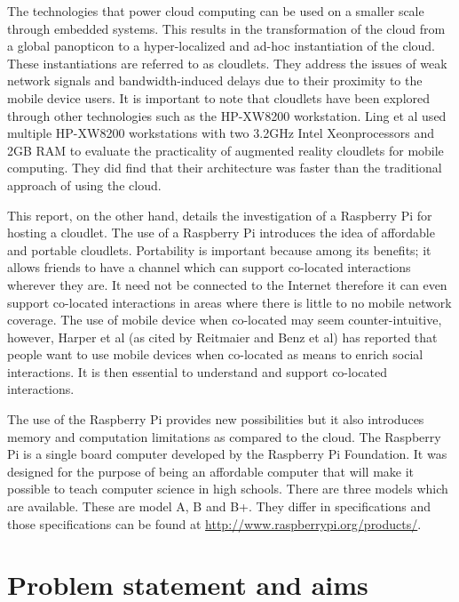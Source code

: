 The technologies that power cloud computing can be used on a smaller scale through embedded systems. This results in the transformation of the cloud from a global panopticon to a hyper-localized and ad-hoc instantiation of the cloud. These instantiations are referred to as cloudlets. They address the issues of weak network signals and bandwidth-induced delays due to their proximity to the mobile device users. It is important to note that cloudlets have been explored through other technologies such as the HP-XW8200 workstation. Ling et al\cite{ling2011ar} used multiple HP-XW8200 workstations with two 3.2GHz Intel Xeonprocessors and 2GB RAM to evaluate the practicality of augmented reality cloudlets for mobile computing. They did find that their architecture was faster than the traditional approach of using the cloud.\newline

This report, on the other hand, details the investigation of a Raspberry Pi for hosting a cloudlet. The use of a Raspberry Pi introduces the idea of affordable and portable cloudlets. Portability is important because among its benefits; it allows friends to have a channel which can support co-located interactions wherever they are. It need not be connected to the Internet therefore it can even support co-located interactions in areas where there is little to no mobile network coverage. The use of mobile device when co-located may seem counter-intuitive, however, Harper et al\cite{RefWorks:15} (as cited by Reitmaier and Benz et al\cite[p. 381]{reitmaier2013designing}) has reported that people want to use mobile devices when co-located as means to enrich social interactions. It is then essential to understand and support co-located interactions.\newline

The use of the Raspberry Pi provides new possibilities but it also introduces memory and computation limitations as compared to the cloud. The Raspberry Pi is a single board computer developed by the Raspberry Pi Foundation. It was designed for the purpose of being an affordable computer that will make it possible to teach computer science in high schools. There are three models which are available. These are model A, B and B+. They differ in specifications and those specifications can be found at \url{ http://www.raspberrypi.org/products/}.

\section {Problem statement and aims}

